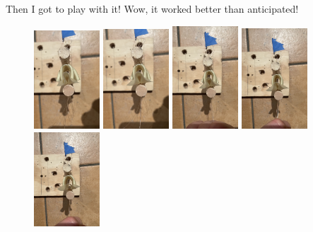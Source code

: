 \documentclass[11pt]{report}
\begin{document}
Then I got to play with it! Wow, it worked better than anticipated!

\begin{figure}[h]
\centering
  \includegraphics[width=0.22\textwidth]{images/46.JPG}
  \includegraphics[width=0.22\textwidth]{images/47.JPG}
  \includegraphics[width=0.22\textwidth]{images/48.JPG}
  \includegraphics[width=0.22\textwidth]{images/49.JPG}
  \includegraphics[width=0.22\textwidth]{images/50.JPG}

\end{figure}
\end{document}
